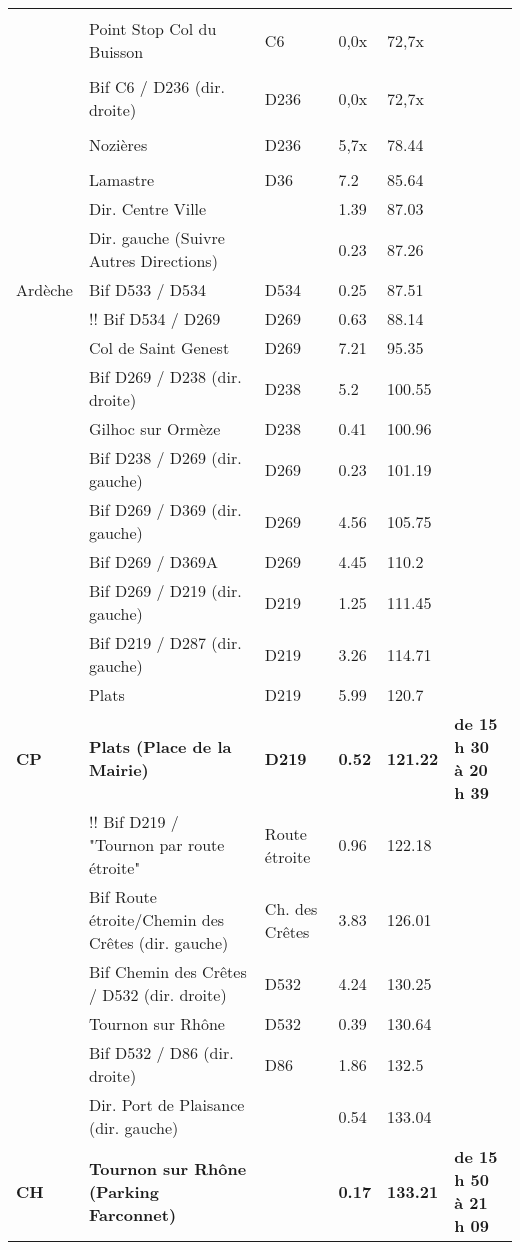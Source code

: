 \documentclass{article}%
\begin{document}
\begin{longtable}{p{2.25cm}|p{7.0cm}|p{1.5cm}|p{1.5cm}|p{1.5cm}|p{3.5cm}}
 & & & & & \\%
 &Point Stop Col du Buisson&C6&0,0x&72,7x& \\%
 & & & & & \\%
 &Bif C6 / D236 (dir. droite)&D236&0,0x&72,7x& \\%
 & & & & & \\%
 &Nozières&D236&5,7x&78.44& \\%
 & & & & & \\%
 &Lamastre &D36&7.2&85.64& \\%
 &Dir. Centre Ville& &1.39&87.03& \\%
 &Dir. gauche (Suivre Autres Directions)& &0.23&87.26& \\%
Ardèche&Bif D533 / D534&D534&0.25&87.51& \\%
 &!! Bif D534 / D269&D269 &0.63&88.14& \\%
 &Col de Saint Genest&D269&7.21&95.35& \\%
 &Bif D269 / D238 (dir. droite)&D238&5.2&100.55& \\%
 &Gilhoc sur Ormèze&D238&0.41&100.96& \\%
 &Bif D238 / D269 (dir. gauche)&D269&0.23&101.19& \\%
 &Bif D269 / D369 (dir. gauche)&D269&4.56&105.75& \\%
 &Bif D269 / D369A&D269&4.45&110.2& \\%
 &Bif D269 / D219 (dir. gauche)&D219&1.25&111.45& \\%
 &Bif D219 / D287 (dir. gauche)&D219&3.26&114.71& \\%
 &Plats&D219&5.99&120.7& \\%
\textbf{CP}&\textbf{Plats (Place de la Mairie) }&\textbf{D219}&\textbf{0.52}&\textbf{121.22}&\textbf{de 15 h 30 à 20 h 39}\\%
 &!! Bif D219 / "Tournon par route étroite"&Route étroite&0.96&122.18& \\%
 &Bif Route étroite/Chemin des Crêtes (dir. gauche)&Ch. des Crêtes&3.83&126.01& \\%
 &Bif Chemin des Crêtes / D532  (dir. droite)&D532&4.24&130.25& \\%
 &Tournon sur Rhône &D532&0.39&130.64& \\%
 &Bif D532 / D86 (dir. droite)&D86&1.86&132.5& \\%
 &Dir. Port de Plaisance (dir. gauche)& &0.54&133.04& \\%
\textbf{CH}&\textbf{Tournon sur Rhône (Parking Farconnet)}& &\textbf{0.17}&\textbf{133.21}&\textbf{de 15 h 50 à 21 h 09}\\%
\hline%
\end{longtable}%
\end{document}

